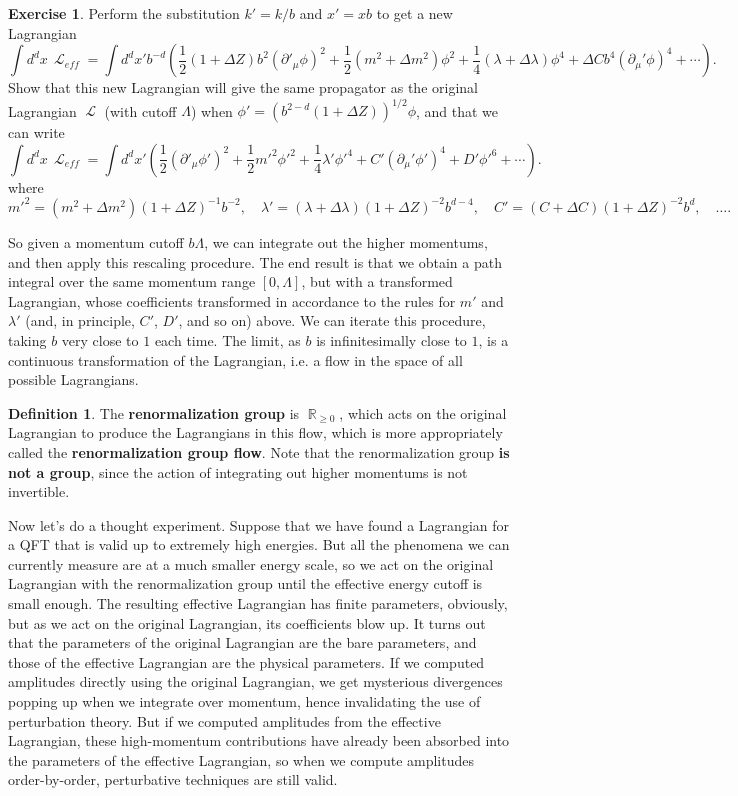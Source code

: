 \documentclass{report}
\theoremstyle{plain}
\theoremstyle{definition}
\newtheorem{definition}[theorem]{Definition}
\newtheorem{exercise}{Exercise}[section]
\theoremstyle{remark}
\DeclareMathOperator{\bR}{\mathbb{R}}
\DeclareMathOperator{\cL}{\mathcal{L}}
\begin{document}
\begin{exercise}
  Perform the substitution $k' = k/b$ and $x' = xb$ to get a new
  Lagrangian
  $$ \int d^dx \, \cL_{eff} = \int d^dx' b^{-d} \left(\frac{1}{2}(1 + \Delta Z)b^2 (\partial'_\mu \phi)^2 + \frac{1}{2} (m^2 + \Delta m^2)\phi^2 + \frac{1}{4} (\lambda + \Delta \lambda) \phi^4 + \Delta C b^4(\partial_\mu' \phi)^4 + \cdots\right). $$
  Show that this new Lagrangian will give the same propagator as the
  original Lagrangian $\cL$ (with cutoff $\Lambda$) when
  $\phi' = (b^{2-d}(1 + \Delta Z))^{1/2}\phi$, and that we can write
  $$ \int d^dx \, \cL_{eff} = \int d^dx' \left(\frac{1}{2}(\partial'_\mu \phi')^2 + \frac{1}{2} m'^2 \phi'^2 + \frac{1}{4} \lambda' \phi'^4 + C'(\partial_\mu' \phi')^4 + D' \phi'^6 + \cdots\right). $$
  where
  $$ m'^2 = (m^2 + \Delta m^2)(1 + \Delta Z)^{-1}b^{-2}, \quad \lambda' = (\lambda + \Delta \lambda)(1 + \Delta Z)^{-2} b^{d-4}, \quad C' = (C + \Delta C)(1 + \Delta Z)^{-2} b^d, \quad \ldots. $$
\end{exercise}

So given a momentum cutoff $b\Lambda$, we can integrate out the higher
momentums, and then apply this rescaling procedure. The end result is
that we obtain a path integral over the same momentum range
$[0, \Lambda]$, but with a transformed Lagrangian, whose coefficients
transformed in accordance to the rules for $m'$ and $\lambda'$ (and,
in principle, $C'$, $D'$, and so on) above. We can iterate this
procedure, taking $b$ very close to $1$ each time. The limit, as $b$
is infinitesimally close to $1$, is a continuous transformation of the
Lagrangian, i.e. a flow in the space of all possible Lagrangians.

\begin{definition}
  The {\bf renormalization group} is $\bR_{\ge 0}$, which acts on the
  original Lagrangian to produce the Lagrangians in this flow, which
  is more appropriately called the {\bf renormalization group flow}.
  Note that the renormalization group {\bf is not a group}, since the
  action of integrating out higher momentums is not invertible.
\end{definition}

Now let's do a thought experiment. Suppose that we have found a
Lagrangian for a QFT that is valid up to extremely high energies. But
all the phenomena we can currently measure are at a much smaller
energy scale, so we act on the original Lagrangian with the
renormalization group until the effective energy cutoff is small
enough. The resulting effective Lagrangian has finite parameters,
obviously, but as we act on the original Lagrangian, its coefficients
blow up. It turns out that the parameters of the original Lagrangian
are the bare parameters, and those of the effective Lagrangian are the
physical parameters. If we computed amplitudes directly using the
original Lagrangian, we get mysterious divergences popping up when we
integrate over momentum, hence invalidating the use of perturbation
theory. But if we computed amplitudes from the effective Lagrangian,
these high-momentum contributions have already been absorbed into the
parameters of the effective Lagrangian, so when we compute amplitudes
order-by-order, perturbative techniques are still valid.
\end{document}
